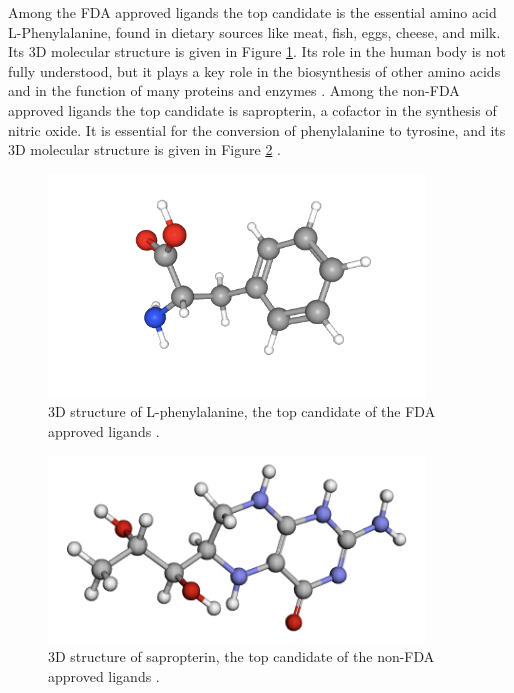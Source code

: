 \documentclass[11pt]{article}
\begin{document}
      Among the FDA approved ligands the top candidate is the essential amino acid L-Phenylalanine, found in dietary sources like meat, fish, eggs, cheese, and milk. Its 3D molecular structure is given in Figure \ref{fig:phen}. Its role in the human body is not fully understood, but it plays a key role in the biosynthesis of other amino acids and in the function of many proteins and enzymes \cite{pubChemLPhen}. Among the non-FDA approved ligands the top candidate is sapropterin, a cofactor in the synthesis of nitric oxide. It is essential for the conversion of phenylalanine to tyrosine, and its 3D molecular structure is given in Figure \ref{fig:sapro} \cite{drugbank}.
  
   \begin{figure}
     \centering
     \includegraphics[width=100mm]{phen}
     \caption{3D structure of L-phenylalanine, the top candidate of the FDA approved ligands \cite{pubChemLPhen}.}
     \label{fig:phen}
   \end{figure}
   
   \begin{figure}
     \centering
     \includegraphics[width=100mm]{sapro}
     \caption{3D structure of sapropterin, the top candidate of the non-FDA approved ligands \cite{drugbank}.}
     \label{fig:sapro}
   \end{figure}

  
\end{document}
